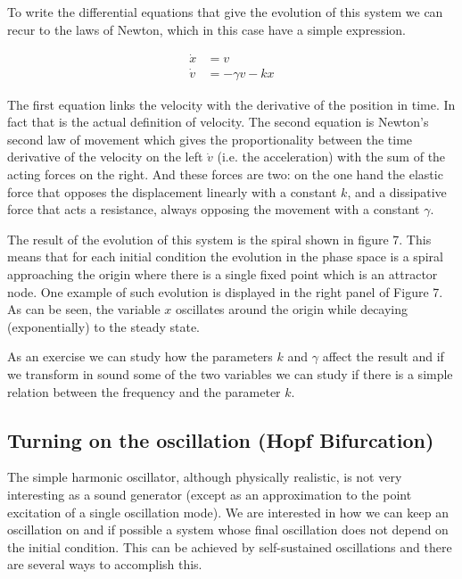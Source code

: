 \documentclass{article}
\begin{document}
To write the differential equations that give the evolution of this system we can recur to the laws of Newton, which in this case have a simple expression. 

\begin{subequations} \label{eq_harmosc}
\begin{align}
    \dot{x} & = v \\
    \dot{v} & = -\gamma v -kx 
\end{align}
\end{subequations}

The first equation links the velocity with the derivative of the position in time. 
In fact that is the actual definition of velocity. 
The second equation is Newton's second law of movement which gives the proportionality between the time derivative of the velocity on the left $\dot v$ (i.e. the acceleration) with the sum of the acting forces on the right. 
And these forces are two: on the one hand the elastic force that opposes the displacement linearly with a constant $k$, and a dissipative force that acts a resistance, always opposing the movement with a constant $\gamma$.

The result of the evolution of this system is the spiral shown in figure 7. 
This means that for each initial condition the evolution in the phase space is a spiral approaching the origin where there is a single fixed point which is an attractor node. One example of such evolution is displayed in the right panel of Figure 7. As can be seen, the variable $x$ oscillates around the origin while decaying (exponentially) to the steady state.

As an exercise we can study how the parameters $k$ and $\gamma$ affect the result and if we transform in sound some of the two variables we can study if there is a simple relation between the frequency and the parameter $k$.

\subsection{Turning on the oscillation (Hopf Bifurcation)}

The simple harmonic oscillator, although physically realistic, is not very interesting as a sound generator (except as an approximation to the point excitation of a single oscillation mode). 
We are interested in how we can keep an oscillation on and if possible a system whose final oscillation does not depend on the initial condition. 
This can be achieved by self-sustained oscillations and there are several ways to accomplish this. 
\end{document}
